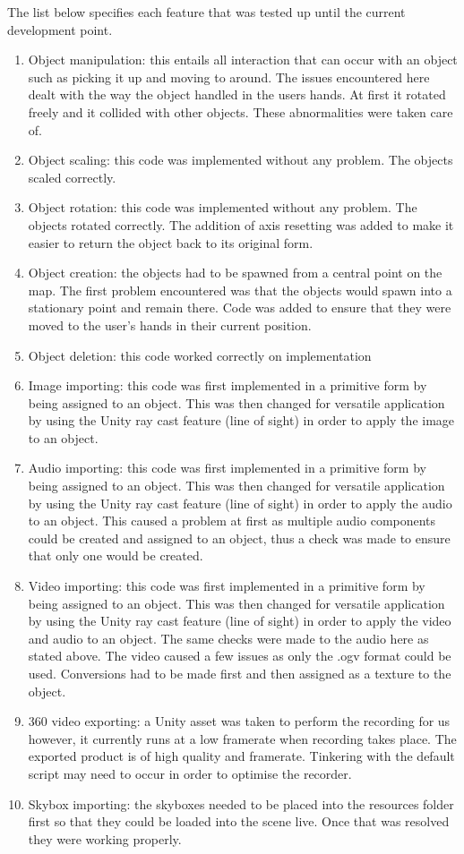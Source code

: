 	\begin{flushleft}
		The list below specifies each feature that was tested up until the current development point.
		\begin{enumerate}
			\item Object manipulation: this entails all interaction that can occur with an object such as picking it up and moving to around. The issues encountered here
			dealt with the way the object handled in the users hands. At first it rotated freely and it collided with other objects. These abnormalities were taken care of.
			\item Object scaling: this code was implemented without any problem. The objects scaled correctly.
			\item Object rotation: this code was implemented without any problem. The objects rotated correctly. The addition of axis resetting was added to make it easier
			to return the object back to its original form.
			\item Object creation: the objects had to be spawned from a central point on the map. The first problem encountered was that the objects would spawn into a stationary
			point and remain there. Code was added to ensure that they were moved to the user's hands in their current position.
			\item Object deletion: this code worked correctly on implementation
		 	\item Image importing: this code was first implemented in a primitive form by being assigned to an object. This was then changed for versatile application by using the Unity
			ray cast feature (line of sight) in order to apply the image to an object.
			\item Audio importing: this code was first implemented in a primitive form by being assigned to an object. This was then changed for versatile application by using the Unity
			ray cast feature (line of sight) in order to apply the audio to an object. This caused a problem at first as multiple audio components could be created and assigned to an
			object, thus a check was made to ensure that only one would be created.
			\item Video importing: this code was first implemented in a primitive form by being assigned to an object. This was then changed for versatile application by using the Unity
			ray cast feature (line of sight) in order to apply the video and audio to an object. The same checks were made to the audio here as stated above. The video caused a few issues
			as only the .ogv format could be used. Conversions had to be made first and then assigned as a texture to the object.
			\item 360 video exporting: a Unity asset was taken to perform the recording for us however, it currently runs at a low framerate when recording takes place. The exported product
			is of high quality and framerate. Tinkering with the default script may need to occur in order to optimise the recorder.
			\item Skybox importing: the skyboxes needed to be placed into the resources folder first so that they could be loaded into the scene live. Once that was resolved they were working
			properly.
		\end{enumerate}
	\end{flushleft}
